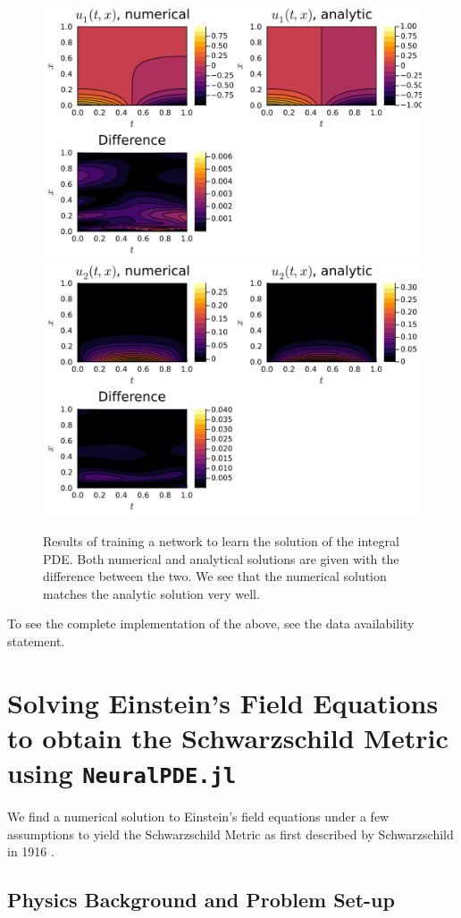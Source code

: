 \documentclass{CUP-JNL-DTM}%
\theoremstyle{definition}
\numberwithin{equation}{section}
\begin{document}
\begin{figure}
\centering
    \includegraphics[width=0.48\linewidth]{figures/integral_PDE_plots/plot_u1.png}
    \includegraphics[width=0.48\linewidth]{figures/integral_PDE_plots/plot_u2.png}
    \caption{Results of training a network to learn the solution of the integral PDE. Both numerical and analytical solutions are given with the difference between the two. We see that the numerical solution matches the analytic solution very well.}
    \label{fig:integro_results}
\end{figure}

To see the complete implementation of the above, see the data availability statement. 


\section{Solving Einstein's Field Equations to obtain the Schwarzschild Metric using \texttt{NeuralPDE.jl}}

We find a numerical solution to Einstein's field equations under a few assumptions to yield the Schwarzschild Metric as first described by Schwarzschild in 1916 \cite{schwarzschildGravitationalFieldMass1999}. 

\subsection{Physics Background and Problem Set-up}
\end{document}
